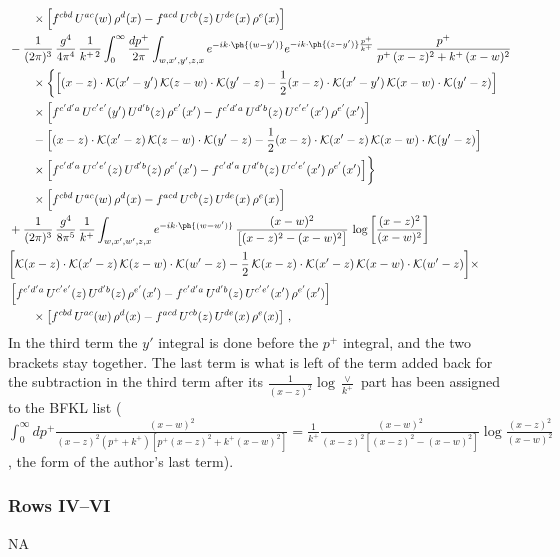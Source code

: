 \begin{align}
&\qquad\times\Big[f^{cbd}\,U^{ac}(w)\,\rho^{d}(x)-f^{acd}\,U^{cb}(z)\,U^{de}(x)\,\rho^{e}(x)\Big]\notag\\
&-\frac{1}{(2\pi)^{3}}\,\frac{g^{4}}{4\pi^{4}}\,\frac{1}{k^{+\,2}}\int_{0}^{\infty}\frac{dp^{+}}{2\pi}\int_{w,x',y',z,x}e^{-ik\cdot\ph{(w-y')}}e^{-ik\cdot\ph{(z-y')}\frac{p^{+}}{k^{+}}}\,\frac{p^{+}}{p^{+}\,(x-z)^{2}+k^{+}\,(x-w)^{2}}\notag\\
&\qquad\times\bigg\{\Big[(x-z)\cdot\mathcal{K}(x'-y')\,\mathcal{K}(z-w)\cdot\mathcal{K}(y'-z)-\frac{1}{2}(x-z)\cdot\mathcal{K}(x'-y')\,\mathcal{K}(x-w)\cdot\mathcal{K}(y'-z)\Big]\notag\\
&\qquad\times\Big[f^{c'd'a}\,U^{c'e'}(y')\,U^{d'b}(z)\,\rho^{e'}(x')-f^{c'd'a}\,U^{d'b}(z)\,U^{c'e'}(x')\,\rho^{e'}(x')\Big]\notag\\
&\qquad-\Big[(x-z)\cdot\mathcal{K}(x'-z)\,\mathcal{K}(z-w)\cdot\mathcal{K}(y'-z)-\frac{1}{2}(x-z)\cdot\mathcal{K}(x'-z)\,\mathcal{K}(x-w)\cdot\mathcal{K}(y'-z)\Big]\notag\\
&\qquad\times\Big[f^{c'd'a}\,U^{c'e'}(z)\,U^{d'b}(z)\,\rho^{e'}(x')-f^{c'd'a}\,U^{d'b}(z)\,U^{c'e'}(x')\,\rho^{e'}(x')\Big]\bigg\}\notag\\
&\qquad\times\Big[f^{cbd}\,U^{ac}(w)\,\rho^{d}(x)-f^{acd}\,U^{cb}(z)\,U^{de}(x)\,\rho^{e}(x)\Big]\notag\\
& +\frac{1}{(2\pi)^{3}}\,\frac{g^{4}}{8\pi^{5}}\,\frac{1}{k^{+}}\int_{w,x',w',z,x}e^{-ik\cdot\ph{(w-w')}}\,\frac{(x-w)^{2}}{\big[(x-z)^{2}-(x-w)^{2}\big]}\,\log\left[\frac{(x-z)^{2}}{(x-w)^{2}}\right]\notag \\ &  \bigg[\mathcal{K}(x-z)\cdot\mathcal{K}(x'-z)\,\mathcal{K}(z-w)\cdot\mathcal{K}(w'-z)-\frac{1}{2}\,\mathcal{K}(x-z)\cdot\mathcal{K}(x'-z)\,\mathcal{K}(x-w)\cdot\mathcal{K}(w'-z)\bigg]   \times\notag \\ & \left[f^{c'd'a}\,U^{c'e'}(z)\,U^{d'b}(z)\,\rho^{e'}(x')-f^{c'd'a}\, U^{d'b}(z)\,U^{c'e'}(x')\,\rho^{e'}(x')\right]\notag\\ &\qquad\times\left[f^{cbd}\,U^{ac}(w)\,\rho^{d}(x) -f^{acd}\,U^{cb}(z)\,U^{de}(x)\,\rho^{e}(x)\right]\,,\label{eq:B-III3two}
\end{align}
In the third term the $y'$ integral is done before the $p^{+}$ integral, and the two brackets stay together. The last term is what is left of the term added back for the subtraction in the third term after its $\frac{1}{(x-z)^{2}}\log\frac{\vee}{k^{+}}$ part has been assigned to the BFKL list ($\int_{0}^{\infty}dp^{+}\frac{(x-w)^{2}}{(x-z)^{2}(p^{+}+k^{+})[p^{+}(x-z)^{2}+k^{+}(x-w)^{2}]}=\frac{1}{k^{+}}\frac{(x-w)^{2}}{(x-z)^{2}[(x-z)^{2}-(x-w)^{2}]}\log\frac{(x-z)^{2}}{(x-w)^{2}}$, the form of the author's last term).
\subsubsection*{Rows IV--VI} \textsc{NA}
